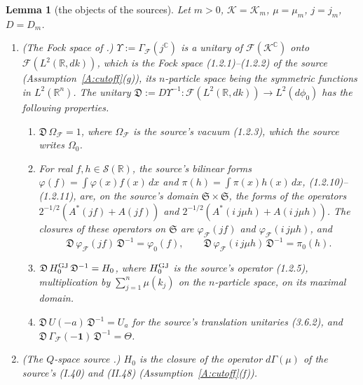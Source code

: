 \documentclass[11pt,a4paper]{article}
\theoremstyle{plain}
\newtheorem{lemma}[theorem]{Lemma}
\theoremstyle{definition}
\theoremstyle{plain}
\theoremstyle{definition}
\newcommand{\R}{\mathbb{R}}
\newcommand{\C}{\mathbb{C}}
\begin{document}
\begin{lemma}[the objects of the sources]\label{lem:ff-sources}
Let $m>0$, $\mathcal K=\mathcal K_m$, $\mu=\mu_m$, $j=j_m$, $D=D_m$.
\begin{enumerate}
\item[\textup{(a)}] \textup{(The Fock space of \cite{GJ2}.)}  $\Upsilon:=\Gamma_{\!\mathcal F}(j^{\C})$
is a unitary of $\mathcal F(\mathcal K^{\C})$ onto $\mathcal F(L^2(\R,dk))$, which is the Fock
space (1.2.1)--(1.2.2) of the source (Assumption~\ref{A:cutoff}(g)), its $n$-particle space
being the symmetric functions in $L^2(\R^n)$.  The unitary $\mathfrak D:=D\Upsilon^{-1}:
\mathcal F(L^2(\R,dk))\to L^2(d\phi_0)$ has the following properties.
 \begin{enumerate}
 \item[\textup{(1)}] $\mathfrak D\,\Omega_{\mathcal F}=1$, where $\Omega_{\mathcal F}$ is the source's vacuum (1.2.3), which
 the source writes $\Omega_0$.
 \item[\textup{(2)}] For real $f,h\in\mathcal S(\R)$, the source's bilinear forms
 $\varphi(f)=\int\varphi(x)f(x)\,dx$ and $\pi(h)=\int\pi(x)h(x)\,dx$, (1.2.10)--(1.2.11), are,
 on the source's domain $\mathfrak S\times\mathfrak S$, the forms of the operators
 $2^{-1/2}(A^*(jf)+A(jf))$ and $2^{-1/2}(A^*(i\,j\mu h)+A(i\,j\mu h))$.  The closures of these
 operators on $\mathfrak S$ are $\varphi_{\mathcal F}(jf)$ and $\varphi_{\mathcal F}(i\,j\mu h)$,
 and
 \[
  \mathfrak D\,\varphi_{\mathcal F}(jf)\,\mathfrak D^{-1}=\varphi_0(f),\qquad
  \mathfrak D\,\varphi_{\mathcal F}(i\,j\mu h)\,\mathfrak D^{-1}=\pi_0(h) .
 \]
 \item[\textup{(3)}] $\mathfrak D\,H_0^{\rm GJ}\,\mathfrak D^{-1}=H_0$, where $H_0^{\rm GJ}$ is
 the source's operator (1.2.5), multiplication by $\sum_{j=1}^n\mu(k_j)$ on the $n$-particle
 space, on its maximal domain.
 \item[\textup{(4)}] $\mathfrak D\,U(-a)\,\mathfrak D^{-1}=U_a$ for the source's translation
 unitaries (3.6.2), and $\mathfrak D\,\Gamma_{\!\mathcal F}(-\mathbf 1)\,\mathfrak D^{-1}=\Theta$.
 \end{enumerate}
\item[\textup{(b)}] \textup{(The $Q$-space source \cite{SimonBook}.)}  $H_0$ is the closure of
the operator $d\Gamma(\mu)$ of the source's (I.40) and (II.48) (Assumption~\ref{A:cutoff}(f)).
\end{enumerate}
\end{lemma}
\end{document}
